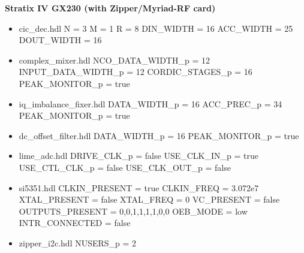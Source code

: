 \begin{minipage}[t]{.5\textwidth}
	\textbf{Stratix IV GX230 (with Zipper/Myriad-RF card)}
	\begin{itemize}
		\item cic\_dec.hdl
			\subitem N = 3
			\subitem M = 1
			\subitem R = 8
			\subitem DIN\_WIDTH = 16
			\subitem ACC\_WIDTH = 25
			\subitem DOUT\_WIDTH = 16
		\item complex\_mixer.hdl
			\subitem NCO\_DATA\_WIDTH\_p = 12
			\subitem INPUT\_DATA\_WIDTH\_p = 12
			\subitem CORDIC\_STAGES\_p = 16
			\subitem PEAK\_MONITOR\_p = true
		\item iq\_imbalance\_fixer.hdl
			\subitem DATA\_WIDTH\_p = 16
			\subitem ACC\_PREC\_p = 34
			\subitem PEAK\_MONITOR\_p = true
		\item dc\_offset\_filter.hdl
			\subitem DATA\_WIDTH\_p = 16
			\subitem PEAK\_MONITOR\_p = true
		\item lime\_adc.hdl
			\subitem DRIVE\_CLK\_p = false
			\subitem USE\_CLK\_IN\_p = true
			\subitem USE\_CTL\_CLK\_p = false
			\subitem USE\_CLK\_OUT\_p = false
		\item si5351.hdl
			\subitem CLKIN\_PRESENT = true
			\subitem CLKIN\_FREQ = 3.072e7
			\subitem XTAL\_PRESENT = false
			\subitem XTAL\_FREQ = 0
			\subitem VC\_PRESENT = false
			\subitem OUTPUTS\_PRESENT = 0,0,1,1,1,1,0,0
			\subitem OEB\_MODE = low
			\subitem INTR\_CONNECTED = false
		\item zipper\_i2c.hdl
			\subitem NUSERS\_p = 2
	\end{itemize}
\end{minipage}

